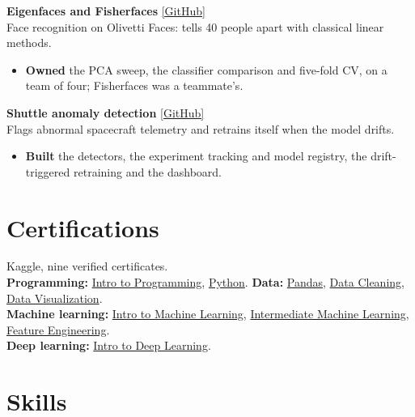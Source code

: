 \documentclass[10pt,a4paper]{article}
\begin{document}
\textbf{Eigenfaces and Fisherfaces} \hfill \href{https://github.com/S4afou/eigenfaces-fisherfaces}{[GitHub]}\\
Face recognition on Olivetti Faces: tells 40 people apart with classical linear methods.
\begin{itemize}
    \item \textbf{Owned} the PCA sweep, the classifier comparison and five-fold CV, on a team of four; Fisherfaces was a teammate's.
\end{itemize}
\textbf{Shuttle anomaly detection} \hfill \href{https://github.com/S4afou/shuttle-nasa-ML}{[GitHub]}\\
Flags abnormal spacecraft telemetry and retrains itself when the model drifts.
\begin{itemize}
    \item \textbf{Built} the detectors, the experiment tracking and model registry, the drift-triggered retraining and the dashboard.
\end{itemize}

\section{Certifications}
Kaggle, nine verified certificates. \\
\textbf{Programming:} \href{https://www.kaggle.com/learn/certification/s4afou/intro-to-programming}{Intro to Programming}, \href{https://www.kaggle.com/learn/certification/s4afou/python}{Python}. \quad
\textbf{Data:} \href{https://www.kaggle.com/learn/certification/s4afou/pandas}{Pandas}, \href{https://www.kaggle.com/learn/certification/s4afou/data-cleaning}{Data Cleaning}, \href{https://www.kaggle.com/learn/certification/s4afou/data-visualization}{Data Visualization}. \\
\textbf{Machine learning:} \href{https://www.kaggle.com/learn/certification/s4afou/intro-to-machine-learning}{Intro to Machine Learning}, \href{https://www.kaggle.com/learn/certification/s4afou/intermediate-machine-learning}{Intermediate Machine Learning}, \href{https://www.kaggle.com/learn/certification/s4afou/feature-engineering}{Feature Engineering}. \\
\textbf{Deep learning:} \href{https://www.kaggle.com/learn/certification/s4afou/intro-to-deep-learning}{Intro to Deep Learning}.

\section{Skills}
\end{document}
